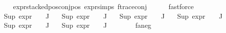 \begin{isabellebody}
\ \ \isamarkupfalse%
\ expr{\isacharunderscore}{\kern0pt}stacked{\isacharunderscore}{\kern0pt}pos{\isacharunderscore}{\kern0pt}conj{\isacharunderscore}{\kern0pt}pos\ expr{\isachardot}{\kern0pt}simps\ f{\isacharunderscore}{\kern0pt}trace{\isacharunderscore}{\kern0pt}conj\isanewline
\ \ \ \ \isamarkupfalse%
\ fastforce{\isacharplus}{\kern0pt}\isanewline
\ \ \isamarkupfalse%
\ {\isachardoublequoteopen}Sup\ {\isacharparenleft}{\kern0pt}{\isacharparenleft}{\kern0pt}expr{\isacharunderscore}{\kern0pt}{}\ {\isasymcirc}\ {\isasymPhi}{\isacharparenright}{\kern0pt}\ {\isacharbackquote}{\kern0pt}\ J{\isacharparenright}{\kern0pt}\ {\isasymle}\ {}{\isachardoublequoteclose}\isanewline
{}\ {\isachardoublequoteopen}Sup\ {\isacharparenleft}{\kern0pt}{\isacharparenleft}{\kern0pt}expr{\isacharunderscore}{\kern0pt}{}\ {\isasymcirc}\ {\isasymPhi}{\isacharparenright}{\kern0pt}\ {\isacharbackquote}{\kern0pt}\ J{\isacharparenright}{\kern0pt}\ {\isasymle}\ {\isasyminfinity}{\isachardoublequoteclose}\isanewline
{}\ {\isachardoublequoteopen}Sup\ {\isacharparenleft}{\kern0pt}{\isacharparenleft}{\kern0pt}expr{\isacharunderscore}{\kern0pt}{}\ {\isasymcirc}\ {\isasymPhi}{\isacharparenright}{\kern0pt}\ {\isacharbackquote}{\kern0pt}\ J{\isacharparenright}{\kern0pt}\ {\isasymle}\ {}{\isachardoublequoteclose}\isanewline
{}\ {\isachardoublequoteopen}Sup\ {\isacharparenleft}{\kern0pt}{\isacharparenleft}{\kern0pt}expr{\isacharunderscore}{\kern0pt}{}\ {\isasymcirc}\ {\isasymPhi}{\isacharparenright}{\kern0pt}\ {\isacharbackquote}{\kern0pt}\ J{\isacharparenright}{\kern0pt}\ {\isasymle}\ {}{\isachardoublequoteclose}\isanewline
{}\ {\isachardoublequoteopen}Sup\ {\isacharparenleft}{\kern0pt}{\isacharparenleft}{\kern0pt}expr{\isacharunderscore}{\kern0pt}{}\ {\isasymcirc}\ {\isasymPhi}{\isacharparenright}{\kern0pt}\ {\isacharbackquote}{\kern0pt}\ J{\isacharparenright}{\kern0pt}\ {\isasymle}\ {}{\isachardoublequoteclose}\isanewline
{}\ {\isachardoublequoteopen}Sup\ {\isacharparenleft}{\kern0pt}{\isacharparenleft}{\kern0pt}expr{\isacharunderscore}{\kern0pt}{}\ {\isasymcirc}\ {\isasymPhi}{\isacharparenright}{\kern0pt}\ {\isacharbackquote}{\kern0pt}\ J{\isacharparenright}{\kern0pt}\ {\isasymle}\ {}{\isachardoublequoteclose}\isanewline
\ \ \ \ \isamarkupfalse%
\ fa{\isacharunderscore}{\kern0pt}neg\isanewline
\ \ \ \ \isamarkupfalse%

\end{isabellebody}
